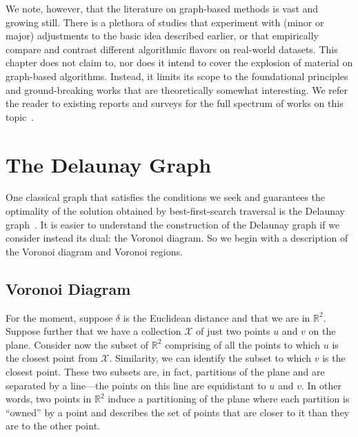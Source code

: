 We note, however, that the literature on graph-based methods is vast and growing still.
There is a plethora of studies that experiment with (minor or major) adjustments to the basic idea
described earlier, or that empirically compare and contrast different algorithmic flavors
on real-world datasets.
This chapter does not claim to, nor does it intend to cover the explosion of
material on graph-based algorithms. Instead, it limits its scope to the foundational
principles and ground-breaking works that are theoretically somewhat interesting.
We refer the reader to existing reports and surveys for the full spectrum of
works on this topic~\citep{wang2021survey-graph-ann,li2020survey-ann}.

\section{The Delaunay Graph}
One classical graph that satisfies the conditions we seek and guarantees the optimality
of the solution obtained by best-first-search traversal
is the Delaunay graph~\citep{Delaunay_1934aa,fortune1997voronoi}.
It is easier to understand the construction of the Delaunay graph if we consider instead
its dual: the Voronoi diagram. So we begin with a description of the Voronoi diagram and
Voronoi regions.

\subsection{Voronoi Diagram}

For the moment, suppose $\delta$ is the Euclidean distance and that we are in $\mathbb{R}^2$.
Suppose further that we have a collection $\mathcal{X}$ of just two points $u$ and $v$
on the plane.
Consider now the subset of $\mathbb{R}^2$ comprising of all the points
to which $u$ is the closest point from $\mathcal{X}$.
Similarity, we can identify the subset to which $v$ is the closest point.
These two subsets are, in fact, partitions of the plane and are separated by a
line---the points on this line are equidistant to $u$ and $v$.
In other words, two points in $\mathbb{R}^2$ induce a partitioning of 
the plane where each partition is ``owned'' by a point and describes the
set of points that are closer to it than they are to the other point.

